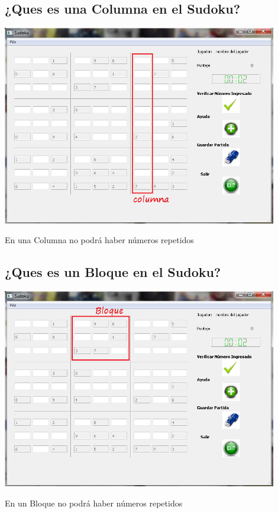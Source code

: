 \documentclass[12pt]{extbook}
\begin{document}
\begin{center}
\section{¿Ques es una Columna en el Sudoku?}
\end{center}
\begin{center}
\includegraphics[width=12cm]{columna1.png}
\end{center}
En una Columna no podrá haber números repetidos\\

\begin{center}
\section{¿Ques es un Bloque en el Sudoku?}
\end{center}
\begin{center}
\includegraphics[width=12cm]{bloque1.png}
\end{center}
En un Bloque no podrá haber números repetidos\\
\end{document}
